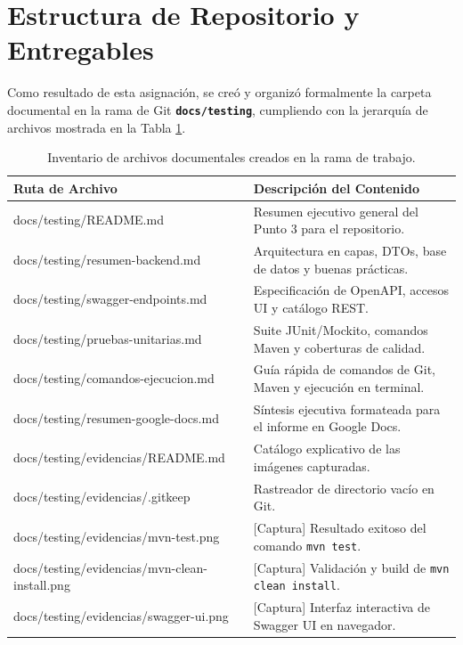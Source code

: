 \documentclass[12pt,a4paper]{article}
\begin{document}
\section{Estructura de Repositorio y Entregables}
Como resultado de esta asignación, se creó y organizó formalmente la carpeta documental en la rama de Git \textbf{\texttt{docs/testing}}, cumpliendo con la jerarquía de archivos mostrada en la Tabla \ref{tab:archivos}.

\begin{table}[H]
    \centering
    \small
    \begin{tabularx}{\textwidth}{@{} >{\ttfamily}l X @{}}
        \toprule
        \textbf{Ruta de Archivo} & \textbf{Descripción del Contenido} \\
        \midrule
        docs/testing/README.md & Resumen ejecutivo general del Punto 3 para el repositorio. \\
        docs/testing/resumen-backend.md & Arquitectura en capas, DTOs, base de datos y buenas prácticas. \\
        docs/testing/swagger-endpoints.md & Especificación de OpenAPI, accesos UI y catálogo REST. \\
        docs/testing/pruebas-unitarias.md & Suite JUnit/Mockito, comandos Maven y coberturas de calidad. \\
        docs/testing/comandos-ejecucion.md & Guía rápida de comandos de Git, Maven y ejecución en terminal. \\
        docs/testing/resumen-google-docs.md & Síntesis ejecutiva formateada para el informe en Google Docs. \\
        docs/testing/evidencias/README.md & Catálogo explicativo de las imágenes capturadas. \\
        docs/testing/evidencias/.gitkeep & Rastreador de directorio vacío en Git. \\
        docs/testing/evidencias/mvn-test.png & [Captura] Resultado exitoso del comando \texttt{mvn test}. \\
        docs/testing/evidencias/mvn-clean-install.png & [Captura] Validación y build de \texttt{mvn clean install}. \\
        docs/testing/evidencias/swagger-ui.png & [Captura] Interfaz interactiva de Swagger UI en navegador. \\
        \bottomrule
    \end{tabularx}
    \caption{Inventario de archivos documentales creados en la rama de trabajo.}
    \label{tab:archivos}
\end{table}
\end{document}
